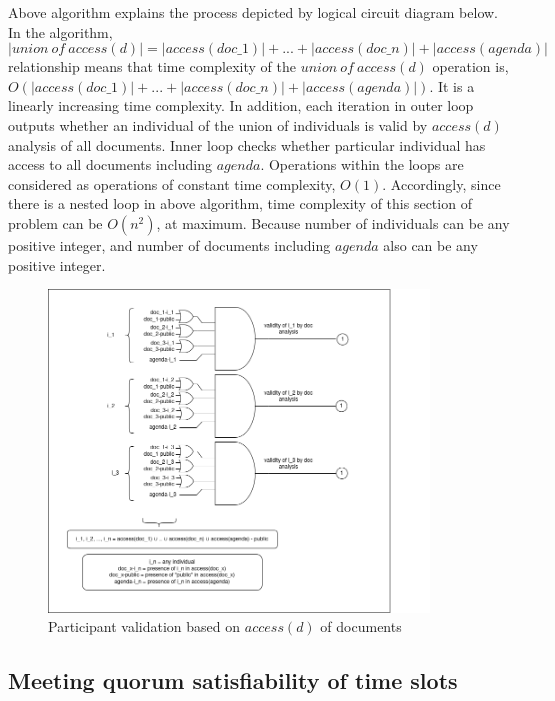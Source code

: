 \documentclass{article}
\begin{document}
Above algorithm explains the process depicted by logical circuit diagram below. In the algorithm, 
\[|union\ of\ access(d)| = |access(doc\_1)| + ... + |access(doc\_n)| + |access(agenda)| \]
relationship means that time complexity of the $union\ of\ access(d)$ operation is, $O(|access(doc\_1)| + ... + |access(doc\_n)| + |access(agenda)|)$. It is a linearly increasing time complexity. In addition, each iteration in outer loop outputs whether an individual of the union of individuals is valid by $access(d)$ analysis of all documents. Inner loop checks whether particular individual has access to all documents including $agenda$. Operations within the loops are considered as operations of constant time complexity, $O(1)$. Accordingly, since there is a nested loop in above algorithm, time complexity of this section of problem can be $O(n^{2})$, at maximum. Because number of individuals can be any positive integer, and number of documents including $agenda$ also can be any positive integer. 

\begin{figure}[H]
    \centering
    \includegraphics[width=0.9\textwidth]{./image/circuit_diagram/1_participant_validation.png}
    \caption{Participant validation based on $access(d)$ of documents}
    \label{fig:participant validation based on documents}
\end{figure} 

\subsection{Meeting quorum satisfiability of time slots}
\end{document}
